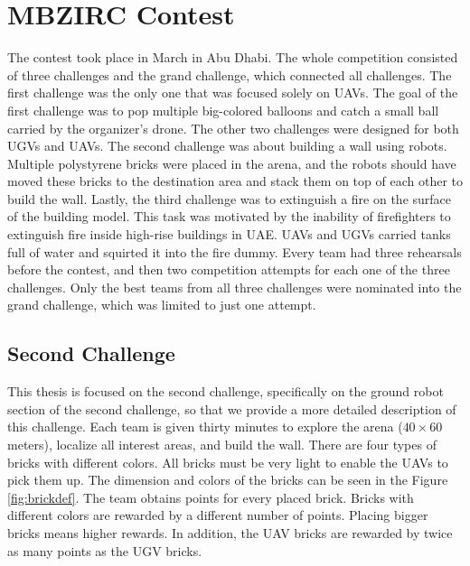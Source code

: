 \section{MBZIRC Contest}
The contest took place in March in Abu Dhabi. The whole competition consisted of three challenges and the grand challenge, which connected all challenges. The first challenge was the only one that was focused solely on UAVs. The goal of the first challenge was to pop multiple big-colored balloons and catch a small ball carried by the organizer's drone. The other two challenges were designed for both UGVs and UAVs. The second challenge was about building a wall using robots. Multiple polystyrene bricks were placed in the arena, and the robots should have moved these bricks to the destination area and stack them on top of each other to build the wall. Lastly, the third challenge was to extinguish a fire on the surface of the building model. This task was motivated by the inability of firefighters to extinguish fire inside high-rise buildings in UAE. UAVs and UGVs carried tanks full of water and squirted it into the fire dummy. Every team had three rehearsals before the contest, and then two competition attempts for each one of the three challenges. Only the best teams from all three challenges were nominated into the grand challenge, which was limited to just one attempt.

\subsection{Second Challenge}
This thesis is focused on the second challenge, specifically on the ground robot section of the second challenge, so that we provide a more detailed description of this challenge. Each team is given thirty minutes to explore the arena ($40 \times 60$ meters), localize all interest areas, and build the wall. There are four types of bricks with different colors. All bricks must be very light to enable the UAVs to pick them up. The dimension and colors of the bricks can be seen in the Figure \ref{fig:brickdef}. The team obtains points for every placed brick. Bricks with different colors are rewarded by a different number of points. Placing bigger bricks means higher rewards. In addition, the UAV bricks are rewarded by twice as many points as the UGV bricks.

